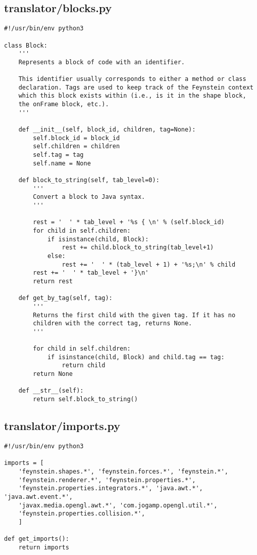 \subsection*{translator/blocks.py}
\begin{lstlisting}
#!/usr/bin/env python3

class Block:
    '''
    Represents a block of code with an identifier. 

    This identifier usually corresponds to either a method or class
    declaration. Tags are used to keep track of the Feynstein context
    which this block exists within (i.e., is it in the shape block,
    the onFrame block, etc.).
    '''

    def __init__(self, block_id, children, tag=None):
        self.block_id = block_id
        self.children = children
        self.tag = tag
        self.name = None

    def block_to_string(self, tab_level=0):
        '''
        Convert a block to Java syntax.
        '''

        rest = '  ' * tab_level + '%s { \n' % (self.block_id)
        for child in self.children:
            if isinstance(child, Block):
                rest += child.block_to_string(tab_level+1)
            else:
                rest += '  ' * (tab_level + 1) + '%s;\n' % child
        rest += '  ' * tab_level + '}\n'
        return rest

    def get_by_tag(self, tag):
        '''
        Returns the first child with the given tag. If it has no
        children with the correct tag, returns None.
        '''

        for child in self.children:
            if isinstance(child, Block) and child.tag == tag: 
                return child
        return None

    def __str__(self):
        return self.block_to_string()
\end{lstlisting}

\subsection*{translator/imports.py}
\begin{lstlisting}
#!/usr/bin/env python3

imports = [
    'feynstein.shapes.*', 'feynstein.forces.*', 'feynstein.*',
    'feynstein.renderer.*', 'feynstein.properties.*', 
    'feynstein.properties.integrators.*', 'java.awt.*', 'java.awt.event.*',
    'javax.media.opengl.awt.*', 'com.jogamp.opengl.util.*', 
    'feynstein.properties.collision.*',
    ]

def get_imports():
    return imports
\end{lstlisting}

